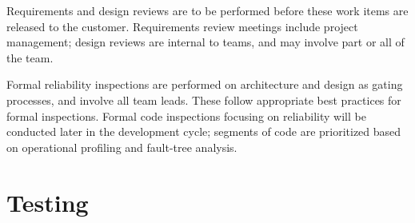 \documentclass[11pt]{wacomepd}
\begin{document}
Requirements and design reviews are to be performed before these work items are released to the
customer.  Requirements review meetings include project management; design reviews are internal to
teams, and may involve part or all of the team.

Formal reliability inspections are performed on architecture and design as gating processes, and
involve all team leads.  These follow appropriate best practices for formal inspections.  Formal
code inspections focusing on reliability will be conducted later in the development cycle; segments
of code are prioritized based on operational profiling and fault-tree analysis.


\chapter{Testing}
\end{document}
